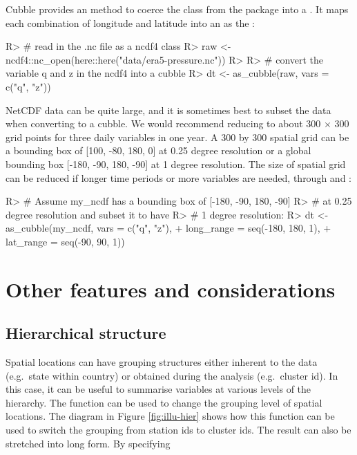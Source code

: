 \documentclass[
]{jss}
\begin{document}
Cubble provides an  method to coerce the  class from the  package into a . It maps each combination of longitude and latitude into an  as the :

\begin{CodeChunk}
\begin{CodeInput}
R> # read in the .nc file as a ncdf4 class
R> raw <- ncdf4::nc_open(here::here("data/era5-pressure.nc"))
R> 
R> # convert the variable q and z in the ncdf4 into a cubble
R> dt <- as_cubble(raw, vars = c("q", "z"))
\end{CodeInput}
\end{CodeChunk}

NetCDF data can be quite large, and it is sometimes best to subset the data when converting to a cubble. We would recommend reducing to about 300 \(\times\) 300 grid points for three daily variables in one year. A 300 by 300 spatial grid can be a bounding box of {[}100, -80, 180, 0{]} at 0.25 degree resolution or a global bounding box {[}-180, -90, 180, -90{]} at 1 degree resolution.
The size of spatial grid can be reduced if longer time periods or more variables are needed, through  and :

\begin{CodeChunk}
\begin{CodeInput}
R> # Assume my_ncdf has a bounding box of [-180, -90, 180, -90]
R> # at 0.25 degree resolution and subset it to have
R> # 1 degree resolution:
R> dt <- as_cubble(my_ncdf, vars = c("q", "z"),
+                 long_range = seq(-180, 180, 1),
+                 lat_range = seq(-90, 90, 1))
\end{CodeInput}
\end{CodeChunk}

\hypertarget{others}{%
\section{Other features and considerations}\label{others}}

\hypertarget{hierarchical-structure}{%
\subsection{Hierarchical structure}\label{hierarchical-structure}}

Spatial locations can have grouping structures either inherent to the data (e.g.~state within country) or obtained during the analysis (e.g.~cluster id). In this case, it can be useful to summarise variables at various levels of the hierarchy. The function  can be used to change the grouping level of spatial locations. The diagram in Figure \ref{fig:illu-hier} shows how this function can be used to switch the grouping from station ids to cluster ids. The result can also be stretched into long form. By specifying
\end{document}

